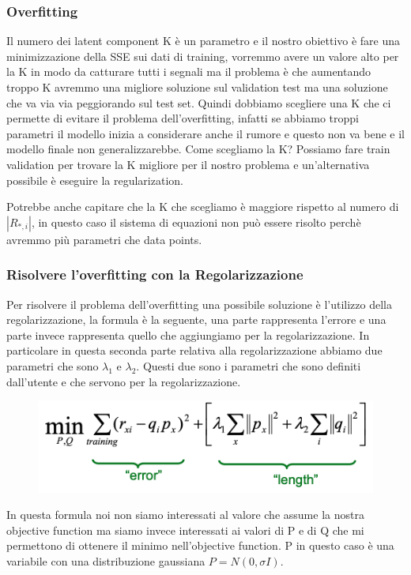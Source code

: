 \documentclass[14pt]{extreport}
\begin{document}
\subsubsection{Overfitting}

Il numero dei latent component K è un parametro e il nostro obiettivo è fare una minimizzazione della SSE sui dati di training, vorremmo avere un valore alto per la 
K in modo da catturare tutti i segnali ma il problema è che aumentando troppo K avremmo una migliore soluzione sul validation test ma una soluzione che va via 
via peggiorando sul test set. 
Quindi dobbiamo scegliere una K che ci permette di evitare il problema dell'overfitting, infatti se abbiamo troppi parametri il modello inizia a 
considerare anche il rumore e questo non va bene e il modello finale non generalizzarebbe. 
Come scegliamo la K? Possiamo fare train validation per trovare la K migliore per il nostro problema e un'alternativa possibile è eseguire la 
regularization.

Potrebbe anche capitare che la K che scegliamo è maggiore rispetto al numero di $|R_{*,i}|$, in questo caso il sistema di equazioni non può essere risolto 
perchè avremmo più parametri che data points.

\subsubsection{Risolvere l'overfitting con la Regolarizzazione}

Per risolvere il problema dell'overfitting una possibile soluzione è l'utilizzo della regolarizzazione, la formula è la seguente, una parte rappresenta l'errore
e una parte invece rappresenta quello che aggiungiamo per la regolarizzazione. In particolare in questa seconda parte relativa alla regolarizzazione abbiamo due parametri 
che sono $\lambda_1$ e $\lambda_2$. Questi due sono i parametri che sono definiti dall'utente e che servono per la regolarizzazione.

\begin{figure}[H] 
\centering
\includegraphics[width=0.7\linewidth]{525.jpeg}
\end{figure}

In questa formula noi non siamo interessati al valore che assume la nostra objective function ma siamo invece interessati ai valori di P e di Q che mi permettono 
di ottenere il minimo nell'objective function. P in questo caso è una variabile con una distribuzione gaussiana $P = N(0, \sigma I)$.
\end{document}
